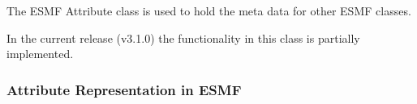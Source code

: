 %

The ESMF Attribute class is used to hold the meta data for other ESMF classes.

In the current release (v3.1.0) the functionality in this class is partially implemented.  

\subsubsection{Attribute Representation in ESMF}
